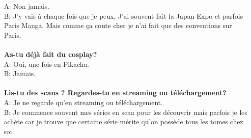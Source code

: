 A: Non jamais.\\
B: J'y vais à chaque fois que je peux. J'ai souvent fait la Japan Expo et
parfois Paris Manga. Mais comme ça coute cher je n'ai fait que des conventions
sur Paris.\\
\\
\textbf{As-tu déjà fait du cosplay?}\\
A: Oui, une fois en Pikachu.\\
B: Jamais.\\
\\
\textbf{Lis-tu des scans ? Regardes-tu en streaming ou téléchargement?}\\
A: Je ne regarde qu'en streaming ou téléchargement.\\
B: Je commence souvent mes séries en scan pour les découvrir mais parfois je
les achète car je trouve que certaine série mérite qu'on possède tous les tomes
chez soi.
